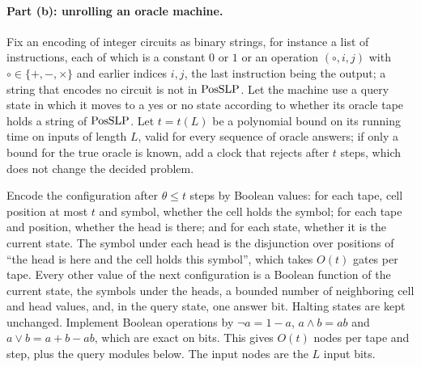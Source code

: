 \paragraph{Part (b): unrolling an oracle machine.}
Fix an encoding of integer circuits as binary strings, for instance a list of
instructions, each of which is a constant $0$ or $1$ or an operation
$(\circ,i,j)$ with $\circ\in\{+,-,\times\}$ and earlier indices $i,j$, the last
instruction being the output; a string that encodes no circuit is not in
$\mathrm{PosSLP}$. Let the machine use a query state in which it moves to a yes or no
state according to whether its oracle tape holds a string of $\mathrm{PosSLP}$. Let
$t=t(L)$ be a polynomial bound on its running time on inputs of length $L$,
valid for every sequence of oracle answers; if only a bound for the true
oracle is known, add a clock that rejects after $t$ steps, which does not
change the decided problem.

Encode the configuration after $\theta\le t$ steps by Boolean values: for each
tape, cell position at most $t$ and symbol, whether the cell holds the symbol;
for each tape and position, whether the head is there; and for each state,
whether it is the current state. The symbol under each head is the
disjunction over positions of ``the head is here and the cell holds this
symbol'', which takes $O(t)$ gates per tape. Every other value of the next
configuration is a Boolean function of the current state, the symbols under
the heads, a bounded number of neighboring cell and head values, and, in the
query state, one answer bit. Halting states are kept unchanged. Implement
Boolean operations by $\neg a=1-a$, $a\wedge b=ab$ and $a\vee b=a+b-ab$, which
are exact on bits. This gives $O(t)$ nodes per tape and step, plus the query
modules below. The input nodes are the $L$ input bits.

